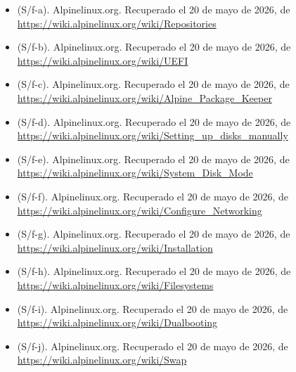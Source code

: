 \documentclass[11pt, letterpaper]{article}
\begin{document}
\begin{itemize}
\item (S/f-a). Alpinelinux.org. Recuperado el 20 de mayo de 2026, de \url{https://wiki.alpinelinux.org/wiki/Repositories}

\item (S/f-b). Alpinelinux.org. Recuperado el 20 de mayo de 2026, de \url{https://wiki.alpinelinux.org/wiki/UEFI}

\item (S/f-c). Alpinelinux.org. Recuperado el 20 de mayo de 2026, de \url{https://wiki.alpinelinux.org/wiki/Alpine\_Package\_Keeper}

\item (S/f-d). Alpinelinux.org. Recuperado el 20 de mayo de 2026, de \url{https://wiki.alpinelinux.org/wiki/Setting\_up\_disks\_manually}

\item (S/f-e). Alpinelinux.org. Recuperado el 20 de mayo de 2026, de \url{https://wiki.alpinelinux.org/wiki/System\_Disk\_Mode}

\item (S/f-f). Alpinelinux.org. Recuperado el 20 de mayo de 2026, de \url{https://wiki.alpinelinux.org/wiki/Configure\_Networking}

\item (S/f-g). Alpinelinux.org. Recuperado el 20 de mayo de 2026, de \url{https://wiki.alpinelinux.org/wiki/Installation}

\item (S/f-h). Alpinelinux.org. Recuperado el 20 de mayo de 2026, de \url{https://wiki.alpinelinux.org/wiki/Filesystems}

\item (S/f-i). Alpinelinux.org. Recuperado el 20 de mayo de 2026, de \url{https://wiki.alpinelinux.org/wiki/Dualbooting}

\item (S/f-j). Alpinelinux.org. Recuperado el 20 de mayo de 2026, de \url{https://wiki.alpinelinux.org/wiki/Swap}
\end{itemize}
\end{document}

